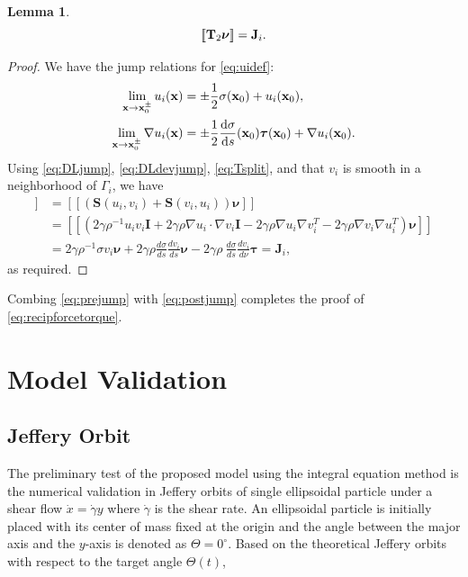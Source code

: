 \documentclass[lineno]{jfm}
\newtheorem{lemma}{Lemma}
\newcommand{\JJ}{\mathbf{J}}
\newcommand{\nnu}{\boldsymbol{\nu}}
\newcommand{\ttau}{\boldsymbol{\tau}}
\newcommand{\xx}{\mathbf{x}}
\newcommand{\jump}[1]{[\![ #1 ]\!]}
\begin{document}
\begin{lemma}
\begin{equation}
\label{eq:postjump}
  \jump{{\bf T}_2\nnu} =  \JJ_i.
\end{equation}
\end{lemma}
\begin{proof}
We have the jump relations for \eqref{eq:uidef}:
\begin{align}
\label{eq:DLjump}
\lim_{\xx \to \xx_0^\pm } u_i(\xx) &= \pm\frac{1}{2}\sigma(\xx_0) + u_i (\xx_0),\\
\label{eq:DLdevjump}
\lim_{\xx \to \xx_0^\pm } \nabla u_i(\xx) &= \pm\frac{1}{2}\frac{\dif \sigma}{\dif s}(\xx_0)\ttau(\xx_0) + \nabla u_i(\xx_0).
\end{align}
Using \eqref{eq:DLjump}, \eqref{eq:DLdevjump}, \eqref{eq:Tsplit}, and
that $v_i$ is smooth in a neighborhood of $\Gamma_i$, we have
\begin{align*}
  \jump{{\bf T}_2\nnu}   &= \jump{(\mathbf{S}(u_i,v_i)  +\mathbf{S}(v_i,u_i))\nnu} \\
  &= \jump{( 2\gamma\rho^{-1} u_i v_i \mathbf{I} + 2\gamma\rho \nabla u_i \cdot \nabla v_i \mathbf{I} 
- 2\gamma\rho \nabla u_i  \nabla v_i^T - 2\gamma\rho \nabla v_i \nabla u_i^T)  \nnu}\\
&= 2\gamma\rho^{-1} \sigma v_i \nnu + 2\gamma\rho \frac{d\sigma }{ds}\frac{dv_i }{ds} \nnu
- 2\gamma\rho \ \frac{d\sigma }{ds} \frac{dv_i }{d\nu} \ttau = \JJ_i,
\end{align*}
as required. 
\end{proof}
  Combing  \eqref{eq:prejump}  with \eqref{eq:postjump} completes the proof of \eqref{eq:recipforcetorque}.




\section{\label{validation}Model Validation}

\subsection{Jeffery Orbit}
The preliminary test of the proposed model using the integral equation method is the numerical validation in Jeffery orbits of single ellipsoidal particle under a shear flow $\dot x = \dot\gamma y$ where $\dot\gamma$ is the shear rate. An ellipsoidal particle is initially placed with its center of mass fixed at the origin and the angle between the major axis and the $y$-axis is denoted as $\Theta = 0^\circ$. Based on the theoretical Jeffery orbits with respect to the target angle $\Theta(t)$, 
\end{document}
